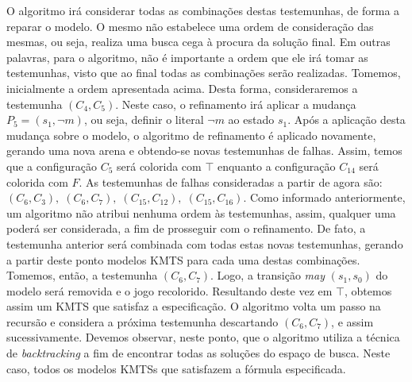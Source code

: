 \documentclass[normaltoc,capchap,capsec,times]{abnt}
\begin{document}
O algoritmo irá considerar todas as combinações destas testemunhas, de forma a reparar o modelo. O mesmo não estabelece uma ordem de consideração das mesmas, ou seja, realiza uma busca cega à procura da solução final. Em outras palavras,  para o algoritmo, não é importante a ordem que ele irá tomar as testemunhas, visto que ao final todas as combinações serão realizadas. Tomemos, inicialmente a ordem apresentada acima. Desta forma, consideraremos a testemunha $(C_4,C_5)$. Neste caso, o refinamento irá aplicar a mudança $P_5={(s_1,\neg m)}$, ou seja, definir o literal $\neg m$ ao estado $s_1$. Após a aplicação desta mudança sobre o modelo, o algoritmo de refinamento é aplicado novamente, gerando uma nova arena e  obtendo-se  novas testemunhas de falhas. Assim, temos que a configuração $C_5$ será colorida com $\top$ enquanto a configuração $C_{14}$ será colorida com $F$. As testemunhas de falhas consideradas a partir de agora são:  $(C_6,C_3), \; (C_6,C_7), \; (C_{15},C_{12}), \; (C_{15},C_{16})$. Como informado anteriormente, um algoritmo não atribui nenhuma ordem às testemunhas, assim, qualquer uma poderá ser considerada, a fim de prosseguir com o refinamento. De fato, a testemunha anterior será combinada com todas estas novas testemunhas, gerando a partir deste  ponto modelos KMTS para cada uma destas combinações. Tomemos, então, a testemunha $(C_6,C_7)$. Logo, a transição \textit{may} $(s_1,s_0)$ do modelo será removida e o jogo recolorido. Resultando deste vez em $\top$, obtemos assim um KMTS que satisfaz a especificação. O algoritmo volta um passo na recursão e considera a próxima testemunha descartando $(C_6,C_7)$, e assim sucessivamente. Devemos observar, neste ponto, que o algoritmo utiliza a técnica de \textit{backtracking} a fim de encontrar todas as soluções do espaço de busca. Neste caso, todos os modelos KMTSs que satisfazem a fórmula especificada. 

\end{document}
